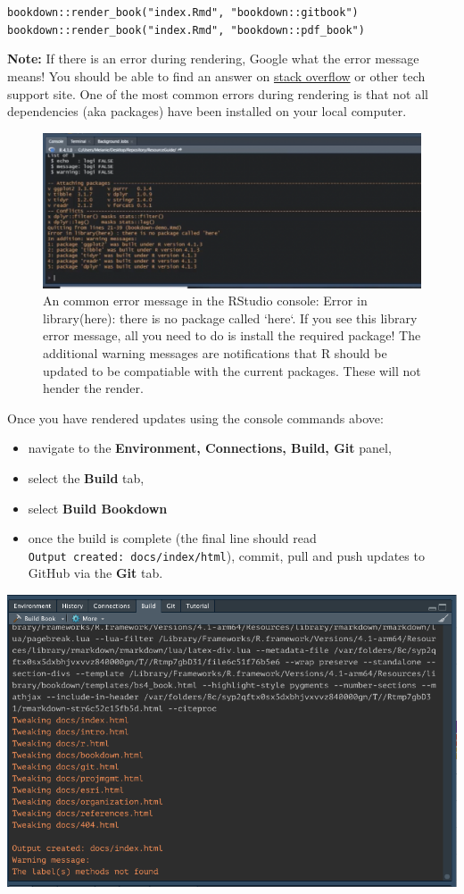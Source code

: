 \documentclass[
]{book}
\providecommand{\tightlist}{%
  \setlength{\itemsep}{0pt}\setlength{\parskip}{0pt}}
\begin{document}
\texttt{bookdown::render\_book("index.Rmd",\ "bookdown::gitbook")}
\texttt{bookdown::render\_book("index.Rmd",\ "bookdown::pdf\_book")}

\textbf{Note:} If there is an error during rendering, Google what the error message means! You should be able to find an answer on \href{https://stackoverflow.com/}{stack overflow} or other tech support site. One of the most common errors during rendering is that not all dependencies (aka packages) have been installed on your local computer.

\begin{figure}

{\centering \includegraphics[width=0.85\linewidth]{images/bookdown_here} 

}

\caption{An common error message in the RStudio console: Error in library(here): there is no package called `here`. If you see this library error message, all you need to do is install the required package! The additional warning messages are notifications that R should be updated to be compatiable with the current packages. These will not hender the render.}\label{fig:rendererror}
\end{figure}

Once you have rendered updates using the console commands above:

\begin{itemize}
\tightlist
\item
  navigate to the \textbf{Environment, Connections, Build, Git} panel,
\item
  select the \textbf{Build} tab,
\item
  select \textbf{Build Bookdown}
\item
  once the build is complete (the final line should read \texttt{Output\ created:\ docs/index/html}), commit, pull and push updates to GitHub via the \textbf{Git} tab.
\end{itemize}

\begin{center}\includegraphics[width=0.75\linewidth]{images/build} \end{center}
\end{document}
